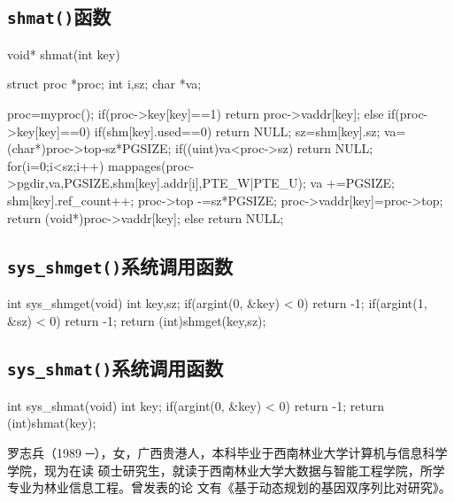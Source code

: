 \documentclass{swfuthesism}
\begin{document}
\subsection{\texttt{shmat()}函数}
\label{sec:shmat}
\begin{ccode}
void* shmat(int key)
{
  struct proc *proc;
  int i,sz;
  char *va;

  proc=myproc();
  if(proc->key[key]==1)
    return proc->vaddr[key];
  else if(proc->key[key]==0)
  {
    if(shm[key].used==0)
      return NULL;
    sz=shm[key].sz;
    va=(char*)proc->top-sz*PGSIZE;
    if((uint)va<proc->sz)
      return NULL;
    for(i=0;i<sz;i++){
      mappages(proc->pgdir,va,PGSIZE,shm[key].addr[i],PTE_W|PTE_U);
      va +=PGSIZE;
    }
    shm[key].ref_count++;
    proc->top -=sz*PGSIZE;
    proc->vaddr[key]=proc->top;
    return (void*)proc->vaddr[key];
  }
  else
    return NULL;
}
\end{ccode}

\subsection{\texttt{sys\_shmget()}系统调用函数}
\label{src:sysshmget}

\begin{ccode}
int sys_shmget(void)
{
  int key,sz;
  if(argint(0, &key) < 0)
    return -1;
  if(argint(1, &sz) < 0)
    return -1;
  return (int)shmget(key,sz);
}
\end{ccode}

\subsection{\texttt{sys\_shmat()}系统调用函数}
\label{src:sysshmat}

\begin{ccode}
int sys_shmat(void)
{
  int key;
  if(argint(0, &key) < 0)
    return -1;
  return (int)shmat(key);
}
\end{ccode}


\doublespacing
\begin{authorInfo}
  罗志兵（1989 ─），女，广西贵港人，本科毕业于西南林业大学计算机与信息科学学院，现为在读
  硕士研究生，就读于西南林业大学大数据与智能工程学院，所学专业为林业信息工程。曾发表的论
  文有《基于动态规划的基因双序列比对研究》。
\end{authorInfo}
\end{document}
